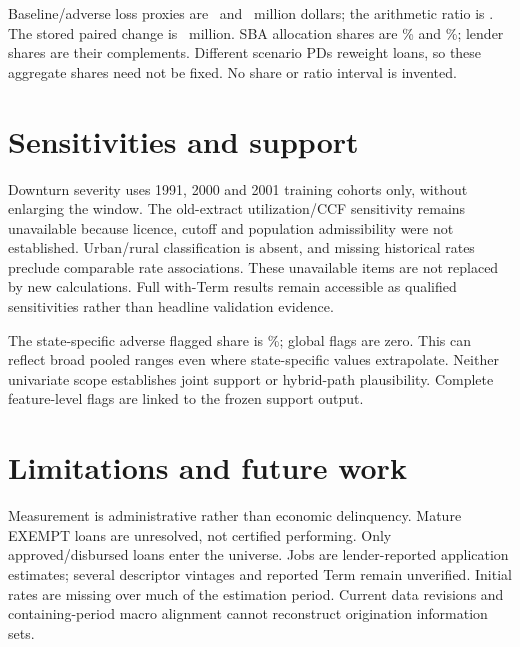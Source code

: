 Baseline/adverse loss proxies are \ElBase\ and \ElAdverse\ million dollars; the arithmetic ratio is \ElRatio. The stored paired change is \ElDiff\ million. SBA allocation shares are \ShareBase\% and \ShareAdverse\%; lender shares are their complements. Different scenario PDs reweight loans, so these aggregate shares need not be fixed. No share or ratio interval is invented.

\section{Sensitivities and support}
Downturn severity uses 1991, 2000 and 2001 training cohorts only, without enlarging the window. The old-extract utilization/CCF sensitivity remains unavailable because licence, cutoff and population admissibility were not established. Urban/rural classification is absent, and missing historical rates preclude comparable rate associations. These unavailable items are not replaced by new calculations. Full with-Term results remain accessible as qualified sensitivities rather than headline validation evidence.

The state-specific adverse flagged share is \SupportShare\%; global flags are zero. This can reflect broad pooled ranges even where state-specific values extrapolate. Neither univariate scope establishes joint support or hybrid-path plausibility. Complete feature-level flags are linked to the frozen support output.

\section{Limitations and future work}
Measurement is administrative rather than economic delinquency. Mature EXEMPT loans are unresolved, not certified performing. Only approved/disbursed loans enter the universe. Jobs are lender-reported application estimates; several descriptor vintages and reported Term remain unverified. Initial rates are missing over much of the estimation period. Current data revisions and containing-period macro alignment cannot reconstruct origination information sets.

